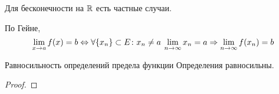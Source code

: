 \begin{Rem}
Для бесконечности на $\mathbb{R}$ есть частные случаи.
\end{Rem}

\begin{Def}
По Гейне,
$$\lim_{x \rightarrow a} f(x) = b \Leftrightarrow \forall \{x_n\}\subset E\colon x_n \ne a\: \lim_{n\rightarrow \infty} x_n = a \Rightarrow \lim_{n \rightarrow \infty} f(x_n) = b$$
\end{Def}

\begin{theorem}{Равносильность определений предела функции}
Определения равносильны.
\end{theorem}
\begin{proof}

\end{proof}